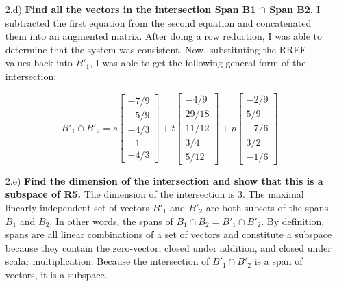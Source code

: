 \documentclass[10pt]{article}
\begin{document}
\begin{enumerate}[leftmargin=\labelsep]
    \item[2.d)] \textbf{Find all the vectors in the intersection Span B1 $\cap$ Span B2.} I subtracted the first equation from the second equation and concatenated them into an augmented matrix. After doing a row reduction, I was able to determine that the system was consistent. Now, substituting the RREF values back into $B'_1$, I was able to get the following general form of the intersection:
    
    $$ B'_1 \cap B'_2 = s\begin{bmatrix}
    -7/9 \\ -5/9 \\ -4/3 \\ -1 \\ -4/3
    \end{bmatrix} + t\begin{bmatrix}
    -4/9 \\ 29/18 \\  11/12 \\ 3/4 \\ 5/12
    \end{bmatrix}
    + p\begin{bmatrix}
    -2/9 \\ 5/9 \\ -7/6 \\ 3/2 \\ -1/6
    \end{bmatrix}
    $$
        
    \item[2.e)] \textbf{Find the dimension of the intersection and show that this is a subspace of R5.}
    The dimension of the intersection is 3. The maximal linearly independent set of vectors $B'_1$ and $B'_2$ are both subsets of the spans $B_1$ and $B_2$. In other words, the spans of $B_1\cap B_2 = B'_1 \cap B'_2$. By definition, spans are all linear combinations of a set of vectors and constitute a subspace because they contain the zero-vector, closed under addition, and closed under scalar multiplication. Because the intersection of $B'_1 \cap B'_2$ is a span of vectors, it is a subspace.
\end{enumerate}
\end{document}
